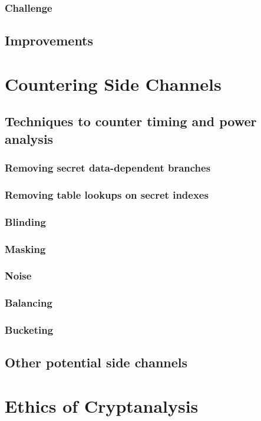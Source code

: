 \documentclass[british,11pt,a4paper]{article}
\begin{document}
\subsubsection{Challenge}

\subsection{Improvements}

\clearpage
\section{Countering Side Channels}
\subsection{Techniques to counter timing and power analysis}
\subsubsection{Removing secret data-dependent branches}
\subsubsection{Removing table lookups on secret indexes}
\subsubsection{Blinding}
\subsubsection{Masking}
\subsubsection{Noise}
\subsubsection{Balancing}
\subsubsection{Bucketing}
\subsection{Other potential side channels}

\clearpage
\section{Ethics of Cryptanalysis}
\end{document}
